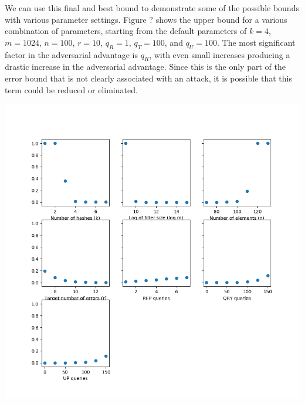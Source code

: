 We can use this final and best bound to demonstrate some of the possible bounds with various parameter settings. Figure ? shows the upper bound for a various combination of parameters, starting from the default parameters of $k = 4$, $m = 1024$, $n = 100$, $r = 10$, $q_R = 1$, $q_T = 100$, and $q_U = 100$. The most significant factor in the adversarial advantage is $q_R$, with even small increases producing a drastic increase in the adversarial advantage. Since this is the only part of the error bound that is not clearly associated with an attack, it is possible that this term could be reduced or eliminated.

\includegraphics[scale=0.75]{BF_Fig}